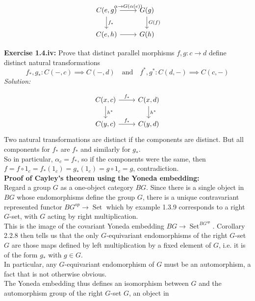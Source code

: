 \documentclass[a4paper]{article}
\DeclareMathOperator{\Set}{Set}
\begin{document}
\begin{equation*}
\begin{tikzcd}
    C(e,g) \arrow[d, "f_*"] \arrow[r, "\alpha \to G(\alpha( e))"] & G(g) \arrow[d, "G(f)"]\\
    C(e,h) \arrow[r] & G(h)
\end{tikzcd}
\end{equation*}

\textbf{Exercise 1.4.iv:} Prove that distinct parallel morphisms
$f, g  \colon c \to d$ define distinct natural transformations
\[
f_*, g_*  \colon C(-,c) \implies C(-,d) \quad
\text{and} \quad f^{*}, g^{*}  \colon C(d,-) \implies C(c,-)
\] 
\textit{Solution:}

\begin{equation*}
\begin{tikzcd}
    C(x,c) \arrow[r, "f_{*}"] \arrow[d, "h^{*}"] & C(x,d) \arrow[d,
    "h^{*}"]\\
    C(y,c) \arrow[r, "f_*"] & C(y,d)
\end{tikzcd}
\end{equation*}
Two natural transformations are distinct if the components are distinct.
But all components for $f_*$ are $f_*$ and similarly for $g_*$.\\
So in particular, $\alpha_c = f_*$, so
if the components were the same, then
$f =f \circ 1_{c} = f_* \left( 1_c \right) 
= g_* \left( 1_c \right) 
= g \circ 1_c = g$, contradiction.\\
\linebreak
\textbf{Proof of Cayley's theorem using the Yoneda embedding:}\\
Regard a group $G$ as a one-object category
$BG$. Since there is a single object in $BG$ whose endomorphisms define the
group $G$, there is a unique contravariant represented functor
$BG^{op} \to \Set$ which by example 1.3.9 corresponds to a right
$G$-set, with $G$ acting by right multiplication.\\
This is the image of the covariant Yoneda embedding
$BG \to \Set^{BG^{op}}$. Corollary 2.2.8 then tells us that the only
$G$-equivariant endomorphisms of the right $G$-set $G$ are those maps defined
by left multiplication by a fixed element of $G$, i.e. it is of the form
$g_*$ with $g \in G$.\\
In particular, any $G$-equivariant endomorphism of $G$ must be an automorphism,
a fact that is not otherwise obvious.\\
The Yoneda embedding thus defines an isomorphism between
$G$ and the automorphism group of the right $G$-set $G$, an object in
\end{document}
